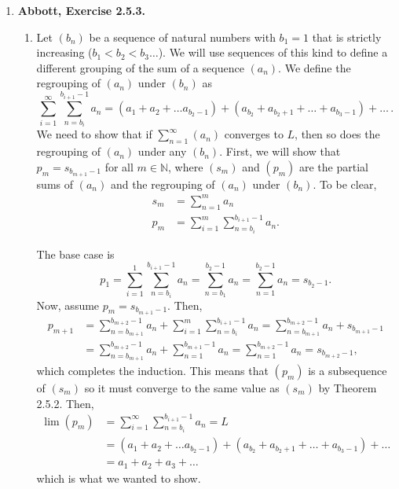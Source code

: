 \documentclass{article}
\newcommand{\N}{\mathbb{N}}
\newcommand{\exc}[2][Abbott]{\item \textbf{#1, Exercise #2.}}
\begin{document}
\begin{enumerate}
    \exc{2.5.3}
    \begin{enumerate}
        \item Let $(b_n)$ be a sequence of natural numbers with $b_1 = 1$ that is strictly increasing ($b_1<b_2<b_3 \dots$). We will use sequences of this kind to define a different grouping of the sum of a sequence $(a_n)$. We define the regrouping of $(a_n)$ under $(b_n)$ as 
        \begin{equation*}
            \sum_{i=1}^\infty \sum_{n=b_i}^{b_{i+1}-1} a_n = (a_1 + a_2 + \dots a_{b_{2}-1}) + (a_{b_2} + a_{b_2 + 1} + \dots + a_{b_3-1}) + \dots \, .
        \end{equation*} We need to show that if $\sum_{n=1}^\infty (a_n)$ converges to $L$, then so does the regrouping of $(a_n)$ under any $(b_n)$. First, we will show that $p_m = s_{b_{m+1}-1}$ for all $m \in \N$, where $(s_m)$ and $(p_m)$ are the partial sums of $(a_n)$ and the regrouping of $(a_n)$ under $(b_n)$. To be clear,
        \begin{align*}
            s_m &= \sum_{n=1}^m a_n \\
            p_m &= \sum_{i=1}^m \sum_{n=b_i}^{b_{i+1}-1} a_n.
        \end{align*}
        
        The base case is 
        \begin{equation*}
            p_1 = \sum_{i=1}^1 \sum_{n=b_i}^{b_{i+1}-1} a_n = \sum_{n=b_1}^{b_{2}-1} a_n = \sum_{n=1}^{b_{2}-1} a_n = s_{b_{2}-1}.
        \end{equation*} Now, assume $p_m = s_{b_{m+1}-1}$. Then, 
        \begin{align*}
            p_{m+1} &= \sum_{n=b_{m+1}}^{b_{m+2}-1} a_n + \sum_{i=1}^m \sum_{n=b_i}^{b_{i+1}-1} a_n = \sum_{n=b_{m+1}}^{b_{m+2}-1} a_n + s_{b_{m+1}-1} \\ & = \sum_{n=b_{m+1}}^{b_{m+2}-1} a_n + \sum_{n=1}^{b_{m+1}-1} a_n = \sum_{n=1}^{b_{m+2}-1} a_n = s_{b_{m+2}-1}, 
        \end{align*} which completes the induction. This means that $(p_m)$ is a subsequence of $(s_m)$ so it must converge to the same value as $(s_m)$ by Theorem 2.5.2. Then,
        \begin{align*}
             \lim (p_m) &= \sum_{i=1}^\infty \sum_{n=b_i}^{b_{i+1}-1} a_n = L \\
             &= (a_1 + a_2 + \dots a_{b_{2}-1}) + (a_{b_2} + a_{b_2 + 1} + \dots + a_{b_3-1}) + \dots \\ &= a_1+a_2+a_3+\dots
        \end{align*} which is what we wanted to show.
        

\end{enumerate}
\end{enumerate}
\end{document}
